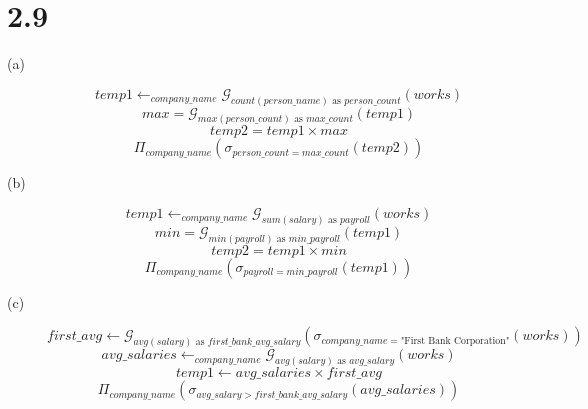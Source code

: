 \documentclass{article}
\begin{document}
\section*{2.9}
\begin{description}
    \item[(a)]
        \[ temp1 \leftarrow _{company\_name} \mathcal{G}_{count(person\_name)
                \text{ as } person\_count}(works) \]
        \[ max = \mathcal{G}_{max (person\_count) \text{ as }
            max\_count}(temp1) \]
        \[ temp2 = temp1 \times max \]
        \[ \Pi_{company\_name}(\sigma_{person\_count = max\_count}(temp2)) \]
    \item[(b)]
        \[ temp1 \leftarrow _{company\_name} \mathcal{G}_{sum(salary)
                    \text{ as } payroll}(works) \]
        \[ min = \mathcal{G}_{min (payroll) \text{ as } min\_payroll}(temp1) \]
        \[ temp2 = temp1 \times min \]
        \[ \Pi_{company\_name}(\sigma_{payroll = min\_payroll}(temp1)) \]
    \item[(c)]
        \[  first\_avg \leftarrow \mathcal{G}_{avg
                    (salary) \text{ as } first\_bank\_avg\_salary}
                (\sigma_{company\_name
                =\text{"First Bank Corporation"}}(works)) \]
        \[ avg\_salaries \leftarrow _{company\_name} \mathcal{G}_{avg
                    (salary) \text { as } avg\_salary}(works) \]
        \[ temp1 \leftarrow avg\_salaries \times first\_avg \]
        \[ \Pi_{company\_name}(\sigma_{avg\_salary > first\_bank\_avg\_salary}(
            avg\_salaries)) \]
\end{description}
\end{document}
